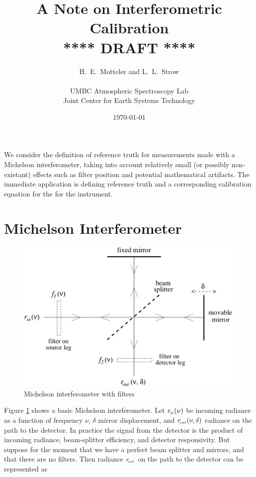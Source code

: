 \documentclass[12pt]{article}
\title{A Note on Interferometric Calibration \\
\vspace{3mm}
{****} DRAFT {****} \\
}
\author{H.~E.~Motteler and L.~L.~Strow \\
  \\
  UMBC Atmospheric Spectroscopy Lab \\
  Joint Center for Earth Systems Technology \\
}
\date{\today}
\begin{document}
\maketitle

We consider the definition of reference truth for measurements made
with a Michelson interferometer, taking into account relatively
small (or possibly non-existant) effects such as filter position and
potential mathematical artifacts.  The immediate application is
defining reference truth and a corresponding calibration equation
for the for the {\cris} instrument.



\section{Michelson Interferometer}

\begin{figure}
  \centering
  \includegraphics[scale=0.5]{figures/mich_filt2.pdf}
  \caption{Michelson interferometer with filters}
  \label{intf1}
\end{figure}

Figure \ref{intf1} shows a basic Michelson interferometer.  Let
$r_{\!\mbox{\tiny in}}(\nu)$ be incoming radiance as a function of frequency $\nu$,
$\delta$ mirror displacement, and $r_{\!\mbox{\tiny out}}(\nu, \delta)$ radiance on
the path to the detector.  In practice the signal from the detector
is the product of incoming radiance, beam-splitter efficiency, and
detector responsivity.  But suppose for the moment that we have a
perfect beam splitter and mirrors, and that there are no filters.
Then radiance $r_{\!\mbox{\tiny out}}$ on the path to the detector can be represented
as
\end{document}
